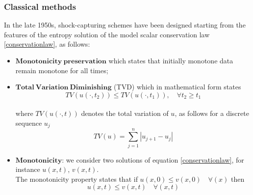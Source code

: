 \documentclass[a5paper]{sapthesis}
\begin{document}
	\subsubsection{Classical methods}
	
	In the late 1950s, shock-capturing schemes have been designed starting from the features of the entropy solution of the model scalar conservation law \ref{conservationlaw}, as follows:
	
	\begin{itemize}
		\item $\mathbf{Monotonicity \ preservation}$ which states that initially monotone data remain monotone for all times;
		\item $\mathbf{Total \ Variation \ Diminishing}$ (TVD) which in mathematical form states
		\begin{equation}
			TV(u(\cdot,t_2))\leq TV(u(\cdot,t_1)), \quad \forall t_2 \geq t_1
		\end{equation}
		\\
		where $TV(u(\cdot,t))$ denotes the total variation of $u$, as follows for a discrete sequence $u_j$
		\begin{equation}
			TV(u) = \sum_{j=1}^{n} |u_{j+1}-u_j|
		\end{equation}
		\item $\mathbf{Monotonicity}$: we consider two solutions of equation \ref{conservationlaw}, for instance $u(x,t)$, $v(x,t)$.\\ The monotonicity property states that if $u(x,0)\leq v(x,0) \quad \forall (x)$ then 
		\begin{equation}
			u(x,t)\leq v(x,t) \quad \forall (x,t)
		\end{equation}
	\end{itemize}
	
\end{document}
